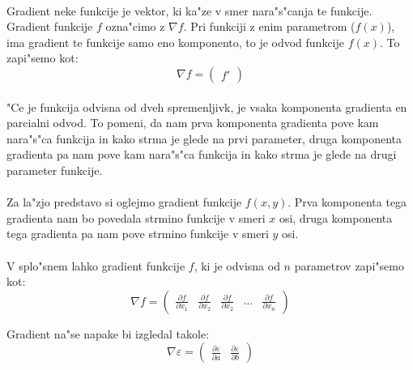 \paragraph{}
Gradient neke funkcije je vektor, ki ka"ze v smer nara"s"canja te funkcije. Gradient funkcije $f$ ozna"cimo z $\nabla f$. Pri funkciji z enim parametrom ($f(x)$), ima gradient te funkcije samo eno komponento, to je odvod funkcije $f(x)$. To zapi"semo kot:
\[\nabla f = \begin{pmatrix}f'\end{pmatrix} \]

\paragraph{}
"Ce je funkcija odvisna od dveh spremenljivk, je vsaka komponenta gradienta en parcialni odvod. To pomeni, da nam prva komponenta gradienta pove kam nara"s"ca funkcija in kako strma je glede na prvi parameter, druga komponenta gradienta pa nam pove kam nara"s"ca funkcija in kako strma je glede na drugi parameter funkcije.

\paragraph{}
Za la"zjo predstavo si oglejmo gradient funkcije $f(x,y)$. Prva komponenta tega gradienta nam bo povedala strmino funkcije v smeri $x$ osi, druga komponenta tega gradienta pa nam pove strmino funkcije v smeri $y$ osi.

\paragraph{}
V splo"snem lahko gradient funkcije $f$, ki je odvisna od $n$ parametrov zapi"semo kot:
\[\nabla f = \begin{pmatrix}
\frac{\partial f}{\partial x_1} &
\frac{\partial f}{\partial x_2} &
\frac{\partial f}{\partial x_2} &
\dots &
\frac{\partial f}{\partial x_n}
\end{pmatrix} \]

Gradient na"se napake bi izgledal takole:
\[\nabla \varepsilon = \begin{pmatrix}
\frac{\partial \varepsilon}{\partial a} &
\frac{\partial \varepsilon}{\partial b}
\end{pmatrix} \]
